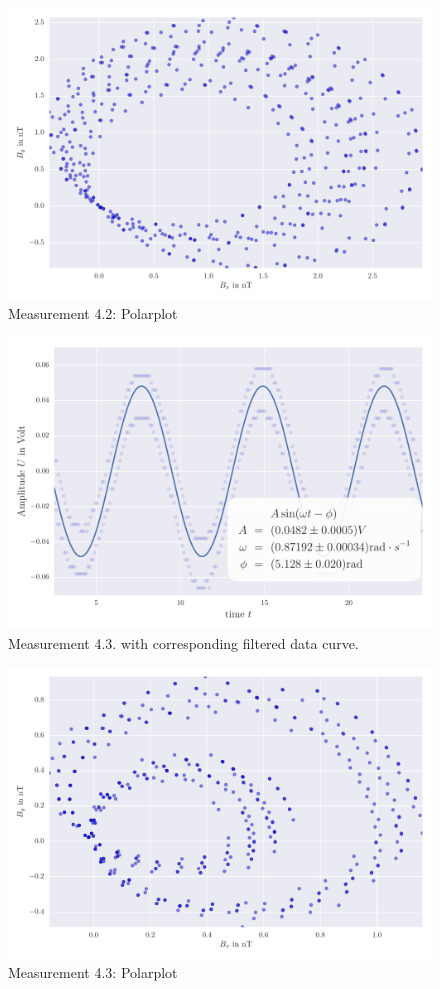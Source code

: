 \begin{figure}[H]
    \centering
    \includegraphics[width=0.7\linewidth]{analysis/figures/polar4_2}
    \caption{Measurement 4.2: Polarplot}
    \label{fig:4_2_polar}
\end{figure}

\begin{figure}[H]
    \centering
    \includegraphics[width=0.7\linewidth]{analysis/figures/fit4_3}
    \caption{Measurement 4.3. with corresponding filtered data curve.}
    \label{fig:4_3_plot}
\end{figure}

\begin{figure}[H]
    \centering
    \includegraphics[width=0.7\linewidth]{analysis/figures/polar4_3}
    \caption{Measurement 4.3: Polarplot}
    \label{fig:4_3_polar}
\end{figure}


